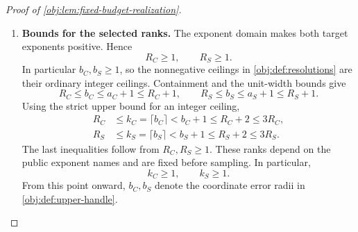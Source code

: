 \documentclass[11pt]{article}
\begin{document}
\begin{proof}[Proof of \cref{obj:lem:fixed-budget-realization}]
\begin{enumerate}
For a power exponent \(\tau\in[0,2]\),
\[
\left|\frac{d}{d\tau}n^\tau\right|
=n^\tau\log n
\le n^2n=n^3,
\]
using \(n\ge1\) and \(\log n\le n\). The mean-value bound and the outward endpoint errors required by \cref{obj:def:arithmetic-engine} therefore show that the returned target boxes satisfy
\[
R_C\in[a_C,b_C],\qquad R_S\in[a_S,b_S],
\]
\[
b_C-a_C,\ b_S-a_S
\le8n^3\epsilon_{\mathrm r}+2\epsilon_{\mathrm r}.
\]
To pay for this width, the integer logarithmic ceiling in \cref{obj:def:resolutions} gives
\[
n\le2^{\lceil\log_2n\rceil},
\qquad
128n^3\epsilon_{\mathrm r}
=
\frac{n^3}{2^{3\lceil\log_2n\rceil}}
\le1.
\]
Since \(n^3\ge1\), it follows that
\[
8n^3\epsilon_{\mathrm r}+2\epsilon_{\mathrm r}
\le10n^3\epsilon_{\mathrm r}
\le\frac{10}{128}\le1.
\]
All rank-step intersections and divisions have thus succeeded, the power inputs satisfy the primitive domain requirements, and both returned boxes have the required unit-width bound.

\item \textbf{Bounds for the selected ranks.}
The exponent domain makes both target exponents positive. Hence
\[
R_C\ge1,\qquad R_S\ge1.
\]
In particular \(b_C,b_S\ge1\), so the nonnegative ceilings in \cref{obj:def:resolutions} are their ordinary integer ceilings. Containment and the unit-width bounds give
\[
R_C\le b_C\le a_C+1\le R_C+1,
\qquad
R_S\le b_S\le a_S+1\le R_S+1.
\]
Using the strict upper bound for an integer ceiling,
\[
\begin{aligned}
R_C&\le k_C=\lceil b_C\rceil<b_C+1\le R_C+2\le3R_C,\\
R_S&\le k_S=\lceil b_S\rceil<b_S+1\le R_S+2\le3R_S.
\end{aligned}
\]
The last inequalities follow from \(R_C,R_S\ge1\). These ranks depend on the public exponent names and are fixed before sampling. In particular,
\[
k_C\ge1,\qquad k_S\ge1.
\]
From this point onward, \(b_C,b_S\) denote the coordinate error radii in \cref{obj:def:upper-handle}.


\end{enumerate}
\end{proof}
\end{document}

